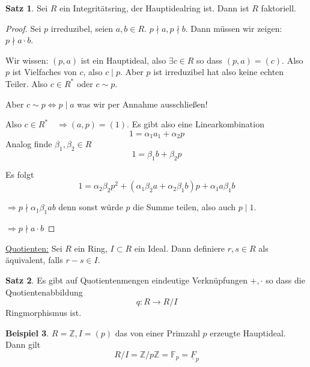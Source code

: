 \documentclass[12pt,parskip=full]{scrartcl}
\newcommand{\setZ}{\mathbb{Z}}
\newcommand{\heading}{\underline}
\theoremstyle{definition}
\newtheorem{theorem}{Satz}[section]
\newtheorem{example}[theorem]{Beispiel}
\theoremstyle{remark}
\begin{document}
	\begin{theorem}
		Sei $R$ ein Integritätsring, der Hauptidealring ist. Dann ist $R$ faktoriell.
	\end{theorem}

	\begin{proof}
		Sei $p$ irreduzibel, seien $a,b \in R$. $p \nmid a, p \nmid b$. Dann müssen wir zeigen: $p \nmid a \cdot b$.
		
		Wir wissen: $(p,a)$ ist ein Hauptideal, also $\exists c \in R$ so dass $(p,a) = (c)$. Also $p$ ist Vielfaches von $c$, also $c \mid p$. Aber $p$ ist irreduzibel hat also keine echten Teiler. Also $c \in R^*$ oder $c \sim p$.
		
		Aber $c \sim p \Leftrightarrow p \mid a$ was wir per Annahme ausschließen!
		
		Also $c \in R^* \quad\Rightarrow (a,p) = (1)$. Es gibt also eine Linearkombination
		\begin{equation*}
			1 = \alpha_1 a_1 + \alpha_2 p \tag{$*$}
		\end{equation*}
		Analog finde $\beta_1, \beta_2 \in R$
		\begin{equation*}
			1 = \beta_1 b + \beta_2 p \tag{$\leftmoon$}
		\end{equation*}
		
		Es folgt
		\begin{equation*}
			1 = \alpha_2 \beta_2 p^2 + (\alpha_1 \beta_2 a + \alpha_2 \beta_1 b)p + \alpha_1 a \beta_1 b
		\end{equation*}
		
		$\Rightarrow p \nmid \alpha_1 \beta_1 a b$ denn sonst würde $p$ die Summe teilen, also auch $p \mid 1$.
		
		$\Rightarrow p \nmid a \cdot b$
	\end{proof}

	\heading{Quotienten:} Sei $R$ ein Ring, $I \subset R$ ein Ideal. Dann definiere $r,s \in R$ als äquivalent, falls $r - s \in I$.
	
	\begin{theorem}
		Es gibt auf Quotientenmengen eindeutige Verknüpfungen $+, \cdot$ so dass die Quotientenabbildung
		\begin{equation*}
			q: R \to R/I
		\end{equation*}
		Ringmorphismus ist.
	\end{theorem}

	\begin{example}
		$R = \setZ, I = (p)$ das von einer Primzahl $p$ erzeugte Hauptideal. Dann gilt
		\begin{equation*}
			R/I = \setZ / p \setZ = \mathbb{F}_p = \underline{F}_p
		\end{equation*}
	\end{example}
\end{document}
